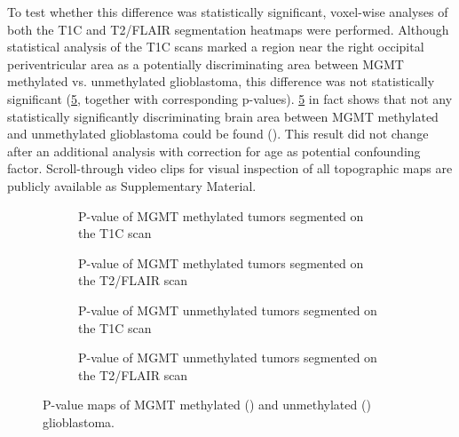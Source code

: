 To test whether this difference was statistically significant, voxel-wise analyses of both the \gls{T1C} and \gls{T2}/\gls{FLAIR} segmentation heatmaps were performed.
Although statistical analysis of the \gls{T1C} scans marked a region near the right occipital periventricular area as a potentially discriminating area between \gls{MGMT} methylated vs. unmethylated glioblastoma, this difference was not statistically significant (\cref{fig:HGG_location_pvalue_map}, together with corresponding p-values).
\cref{fig:HGG_location_pvalue_map} in fact shows that not any statistically significantly discriminating brain area between \gls{MGMT} methylated and unmethylated glioblastoma could be found ().
This result did not change after an additional analysis with correction for age as potential confounding factor.
Scroll-through video clips for visual inspection of all topographic maps are publicly available as Supplementary Material.

\begin{figure}
    \centering
    \begin{subfigure}[b]{\textwidth}
        \centering
        \caption{P-value of \gls{MGMT} methylated \glspl{tumor} segmented on  the \gls{T1C} scan}\label{fig:HGG_location_pvalue_methylated_T1}
    \end{subfigure}
    \begin{subfigure}[b]{\textwidth}
        \centering
        \caption{P-value of \gls{MGMT} methylated \glspl{tumor} segmented on  the \gls{T2}/\gls{FLAIR} scan}\label{fig:HGG_location_pvalue_methylated_T2}
    \end{subfigure}
    \begin{subfigure}[b]{\textwidth}
        \centering
        \caption{P-value of \gls{MGMT} unmethylated \glspl{tumor} segmented on  the \gls{T1C} scan}\label{fig:HGG_location_pvalue_unmethylated_T1}
    \end{subfigure}
    \begin{subfigure}[b]{\textwidth}
        \centering
        \caption{P-value of \gls{MGMT} unmethylated \glspl{tumor} segmented on  the \gls{T2}/\gls{FLAIR} scan}\label{fig:HGG_location_pvalue_unmethylated_T2}
    \end{subfigure}
    \caption{P-value maps of \acrshort{MGMT} methylated () and unmethylated () glioblastoma.}\label{fig:HGG_location_pvalue_map}
\end{figure}


